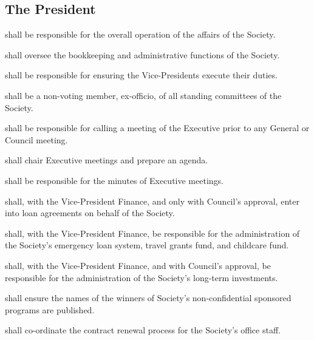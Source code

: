 \subsection {The President}
\begin{longenum}[ label*=\thesubsection.\arabic*., align=left]
	\item shall be responsible for the overall operation of the affairs of the Society.
    \item shall oversee the bookkeeping and administrative functions of the Society. 
    \item shall be responsible for ensuring the Vice-Presidents execute their duties. 
    \item shall be a non-voting member, ex-officio, of all standing committees of the Society. \label{pres: all committees}
    \item shall be responsible for calling a meeting of the Executive prior to any General or Council meeting.
    \item shall chair Executive meetings and prepare an agenda.
    \item shall be responsible for the minutes of Executive meetings. 
    \item shall, with the Vice-President Finance, and only with Council's approval, enter into loan agreements on behalf of the Society.
    \item shall, with the Vice-President Finance, be responsible for the administration of the Society's emergency loan system, travel grants fund, and childcare fund. 
    \item shall, with the Vice-President Finance, and with Council's approval, be responsible for the administration of the Society's long-term investments. 
    \item shall ensure the names of the winners of Society's non-confidential sponsored programs are published.
    \item shall co-ordinate the contract renewal process for the Society's office staff. 

\end{longenum}
